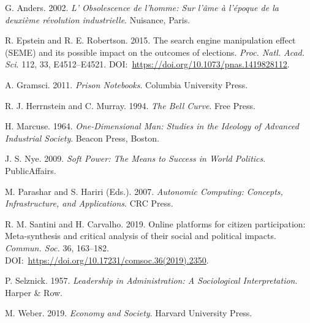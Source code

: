 \begin{thebibliography}{}
 G. Anders. 2002. \textit{L' Obsolescence de l'homme: Sur l'\^{a}me \`{a} l'\'{e}poque de la deuxi\`{e}me r\'{e}volution industrielle}. Nuisance, Paris.

 R. Epstein and R. E. Robertson. 2015. The search engine manipulation effect (SEME) and its possible impact on the outcomes of elections. \textit{Proc. Natl. Acad. Sci}. 112, 33, E4512--E4521. DOI:~\href{https://doi.org/10.1073/pnas.1419828112}{https://{\allowbreak}doi.{\allowbreak}org/{\allowbreak}10.{\allowbreak}1073/{\allowbreak}pnas.{\allowbreak}1419828112}.

 A. Gramsci. 2011. \textit{Prison Notebooks}. Columbia University Press.

 R. J. Herrnstein and C. Murray. 1994. \textit{The Bell Curve}. Free Press.

 H. Marcuse. 1964. \textit{One-Dimensional Man: Studies in the Ideology of Advanced Industrial Society}. Beacon Press, Boston.

 J. S. Nye. 2009. \textit{Soft Power: The Means to Success in World Politics}. PublicAffairs.

 M. Parashar and S. Hariri (Eds.). 2007. \textit{Autonomic Computing: Concepts, Infrastructure, and Applications}. CRC Press.

 R. M. Santini and H. Carvalho. 2019. Online platforms for citizen participation: Meta-synthesis and critical analysis of their social and political impacts. \textit{Commun. Soc.} 36, 163--182. DOI:~\href{https://doi.org/10.17231/comsoc.36(2019).2350}{https://{\allowbreak}doi.{\allowbreak}org/{\allowbreak}10.{\allowbreak}17231/{\allowbreak}comsoc.{\allowbreak}36{\allowbreak}(2019){\allowbreak}.{\allowbreak}2350}.

 P. Selznick. 1957. \textit{Leadership in Administration: A Sociological Interpretation}. Harper \& Row.

 M. Weber. 2019. \textit{Economy and Society}. Harvard University Press.

\end{thebibliography}

%

